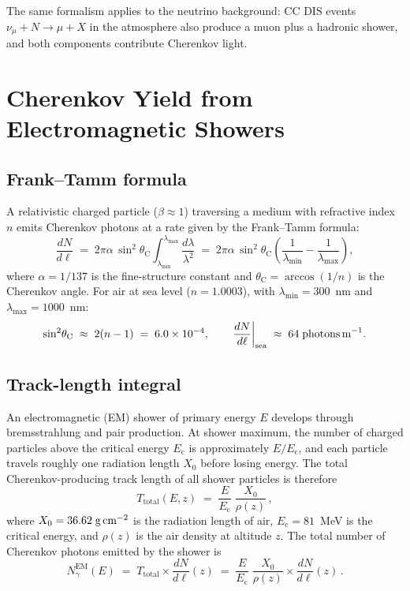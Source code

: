 \documentclass[11pt]{article}
\newcommand{\Ec}{E_{\mathrm{c}}}
\newcommand{\thetaC}{\theta_{\mathrm{C}}}
\begin{document}
The same formalism applies to the neutrino background: CC DIS events
$\nu_\mu + N \to \mu + X$ in the atmosphere also produce a muon plus a
hadronic shower, and both components contribute Cherenkov light.

\section{Cherenkov Yield from Electromagnetic Showers}
\label{sec:em_yield}

\subsection{Frank--Tamm formula}

A relativistic charged particle ($\beta \approx 1$) traversing a medium
with refractive index $n$ emits Cherenkov photons at a rate given by the
Frank--Tamm formula:
\begin{equation}
  \frac{dN}{d\ell} \;=\;
  2\pi\alpha\,\sin^2\!\thetaC
  \int_{\lambda_{\min}}^{\lambda_{\max}}
  \frac{d\lambda}{\lambda^2}
  \;=\;
  2\pi\alpha\,\sin^2\!\thetaC
  \left(\frac{1}{\lambda_{\min}} - \frac{1}{\lambda_{\max}}\right),
  \label{eq:frank_tamm}
\end{equation}
where $\alpha = 1/137$ is the fine-structure constant and
$\thetaC = \arccos(1/n)$ is the Cherenkov angle.  For air at sea level
($n = 1.0003$), with $\lambda_{\min} = 300$~nm and
$\lambda_{\max} = 1000$~nm:
\begin{equation}
  \sin^2\!\thetaC \;\approx\; 2(n-1) \;=\; 6.0 \times 10^{-4},
  \qquad
  \left.\frac{dN}{d\ell}\right|_{\text{sea}}
  \;\approx\; 64\;\text{photons\,m}^{-1}.
  \label{eq:dndl_sea}
\end{equation}

\subsection{Track-length integral}

An electromagnetic (EM) shower of primary energy $E$ develops through
bremsstrahlung and pair production.  At shower maximum, the number of
charged particles above the critical energy $\Ec$ is approximately
$E/\Ec$, and each particle travels roughly one radiation length $X_0$
before losing energy.  The total Cherenkov-producing track length of all
shower particles is therefore~\cite{Nerling2006,IceCube2013}
\begin{equation}
  T_{\mathrm{total}}(E,z) \;=\;
  \frac{E}{\Ec}\;\frac{X_0}{\rho(z)}\,,
  \label{eq:track_length}
\end{equation}
where $X_0 = 36.62\;\text{g\,cm}^{-2}$ is the radiation length of air,
$\Ec = 81$~MeV is the critical energy, and $\rho(z)$ is the air
density at altitude $z$.  The total number of Cherenkov photons emitted
by the shower is
\begin{equation}
  N_{\gamma}^{\mathrm{EM}}(E) \;=\;
  T_{\mathrm{total}} \times \frac{dN}{d\ell}(z)
  \;=\;
  \frac{E}{\Ec}\;\frac{X_0}{\rho(z)}
  \times \frac{dN}{d\ell}(z)\,.
  \label{eq:Nph_em}
\end{equation}
\end{document}
